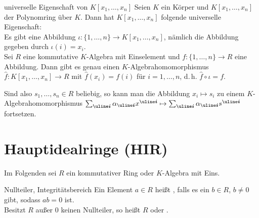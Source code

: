 \begin{Satz}{universelle Eigenschaft von $K[x_1, \dotsc, x_n]$}
    Seien $K$ ein Körper und
    $K[x_1, \dotsc, x_n]$ der Polynomring über $K$.
    Dann hat $K[x_1, \dotsc, x_n]$ folgende universelle Eigenschaft: \\
    Es gibt eine Abbildung
    $\iota: \{1, \dotsc, n\} \rightarrow K[x_1, \dotsc, x_n]$,
    nämlich die Abbildung gegeben durch $\iota(i) = x_i$. \\
    Sei $R$ eine kommutative $K$-Algebra mit Einselement und
    $f: \{1, \dotsc, n\} \rightarrow R$ eine Abbildung.
    Dann gibt es genau einen $K$-Algebrahomomorphismus
    $\widehat{f}: K[x_1, \dotsc, x_n] \rightarrow R$ mit
    $\widehat{f}(x_i) = f(i)$ für $i = 1, \dotsc, n$,
    d.\,h. $\widehat{f} \circ \iota = f$.
\end{Satz}

\begin{Bem}
    Sind also $s_1, \dotsc, s_n \in R$ beliebig, so kann man
    die Abbildung $x_i \mapsto s_i$ zu einem $K$-Algebrahomomorphismus
    $\sum_{\mi{i}} \alpha_{\mi{i}} x^{\mi{i}} \mapsto
    \sum_{\mi{i}} \alpha_{\mi{i}} s^{\mi{i}}$ fortsetzen.
\end{Bem}

\section{%
    Hauptidealringe (HIR)%
}

\begin{Bem}
    Im Folgenden sei $R$ ein kommutativer Ring oder $K$-Algebra mit Eins.
\end{Bem}

\begin{Def}{Nullteiler, Integritätsbereich}
    Ein Element $a \in R$ heißt , falls
    es ein $b \in R$, $b \not= 0$ gibt, sodass $ab = 0$ ist. \\
    Besitzt $R$ außer $0$ keinen Nullteiler, so heißt
    $R$  oder .
\end{Def}

